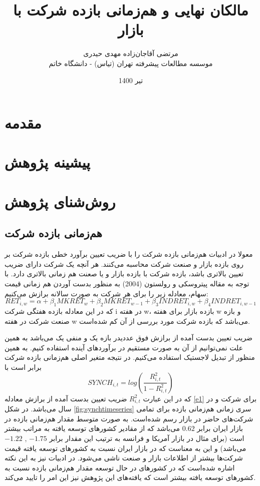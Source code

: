 \documentclass[12pt, a4paper]{article}
\title{مالکان نهایی و هم‌زمانی بازده شرکت با بازار}
\author{
	مرتضی آقاجان‌زاده
	 \sym{*} 
	\qquad 
	مهدی حیدری 
	\sym{*} 
	 \\
	\sym{*} 
	\footnotesize  موسسه مطالعات پیشرفته تهران (تیاس) - دانشگاه خاتم
}
\date{
تیر 1400}
\begin{document}
\maketitle

\section{مقدمه}
\section{پیشینه پژوهش}
\section{روش‌شنای پژوهش}
\subsection{هم‌زمانی بازده شرکت}
معولا در ادبیات هم‌زمانی بازده شرکت را با ضریب تعیین برآورد خطی بازده شرکت بر روی بازده بازار و صنعت شرکت محاسبه می‌کنند. هر آنچه یک شرکت دارای ضریب تعیین بالاتری باشد، بازده شرکت با بازده بازار و یا صعنت هم زمانی بالاتری دارد. 
با توجه به مقاله 
پیتروسکی و رولستون (2004)
به منظور بدست آوردن هم زمانی قیمت سهام، معادله زیر را برای هر شرکت به صورت سالانه برازش می‌کنیم:
	\begin{equation}\label{e1}
		RET_{i,w} = \alpha + \beta_1 MKRET_{w}+ \beta_2 MKRET_{w-1}  + \beta_3 INDRET_{i,w} + \beta_4 INDRET_{i,w-1} 
	\end{equation}
	که در این معادله 
	بازده هفتگی شرکت i در هفته w، 
	بازده بازار برای هفته w و
	بازه صنعت شرکت در هفته w می‌باشد که بازده شرکت مورد بررسی از آن کم شده‌است. 
	
	ضریب تعیین بدست آمده از برازش فوق عددیدر بازه یک و منفی یک می‌باشد به همین علت نمی‌توانیم از آن به صورت مستقیم در برآورد‌های آینده استفاده کنیم. به همین منظور از تبدیل لاجستیک استفاده می‌کنیم. در نتیجه متغیر اصلی هم‌زمانی بازده شرکت برابر است با 	
	\begin{equation}
		SYNCH_{i,t} = log(\frac{R^2_{i,t}}{1-R^2_{i,t}})
	\end{equation}
که در این عبارت $  R^2_{i,t}$ ضریب تعیین بدست آمده از برازش معادله 
\ref{e1}
برای شرکت
  و در سال
  می‌باشد. در شکل
  \ref{fig:synchtimeseries} 
  سری زمانی هم‌زمانی بازده برای تمامی شرکت‌های حاضر در بازار رسم شده‌است. به صورت متوسط مقدار هم‌زمانی بازده در بازار ایران برابر
$    0.62 $
   می‌باشد که از مقادیر کشور‌های توسعه یافته به مراتب بیشتر است (برای مثال در بازار آمریکا  و فرانسه به ترتیب این مقدار برابر
   $    -1.75  $ , $ -1.22 $
   می‌باشد) و این به معناست که در بازار ایران  نسبت به کشور‌های توسعه یافته قیمت شرکت‌ها بیشتر از اطلاعات بازار و صنعت ناشی می‌شود.   در ادبیات نیز به این نکته اشاره شده‌است که در کشور‌های در حال توسعه مقدار هم‌زمانی بازده نسبت به کشور‌های توسعه یافته بیشتر است که یافته‌های این پژوهش نیز این امر را تایید می‌کند.
  
\end{document}
